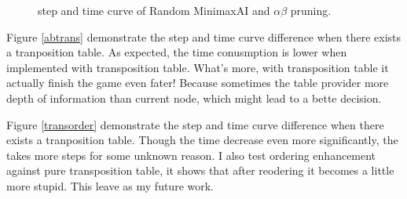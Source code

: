 \documentclass{article}
\begin{document}
\begin{figure}[!h]
\normalsize
\centering
{}
\caption{step and time curve of Random MinimaxAI and $\alpha\beta$ pruning.}
\label{miniab} %
\end{figure}

Figure \ref{abtrans} demonstrate the step and time curve difference when there exists a tranposition table. As expected, the time conusmption is lower when implemented with transposition table. What's more, with transposition table it actually finish the game even fater! Because sometimes the table provider more depth of information than current node, which might lead to a bette decision.

Figure \ref{transorder} demonstrate the step and time curve difference when there exists a tranposition table. Though the time decrease even more significantly, the takes more steps for some unknown reason. I also test ordering enhancement against pure transposition table, it shows that after reodering it becomes a little more stupid. This leave as my future work.
\end{document}
